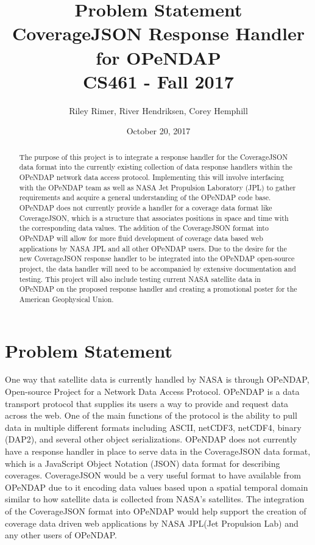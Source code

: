 \documentclass[letterpaper,10pt,draftclsnofoot,onecolumn]{IEEEtran}
\title{
Problem Statement\\ 
\large CoverageJSON Response Handler for OPeNDAP\\
\large CS461 -  Fall 2017\\
}
\author{Riley Rimer, River Hendriksen, Corey Hemphill}
\date{October 20, 2017}
\begin{document}
\begin{titlepage}

\maketitle
% 
% 
\centering

\begin{abstract}
The purpose of this project is to integrate a response handler for the CoverageJSON data format into the currently existing collection of data response handlers within the OPeNDAP network data access protocol. Implementing this will involve interfacing with the OPeNDAP team as well as NASA Jet Propulsion Laboratory (JPL) to gather requirements and acquire a general understanding of the OPeNDAP code base. OPeNDAP does not currently provide a handler for a coverage data format like CoverageJSON, which is a structure that associates positions in space and time with the corresponding data values. The addition of the CoverageJSON format into OPeNDAP will allow for more fluid development of coverage data based web applications by NASA JPL and all other OPeNDAP users. Due to the desire for the new CoverageJSON response handler to be integrated into the OPeNDAP open-source project, the data handler will need to be accompanied by extensive documentation and testing. This project will also include testing current NASA satellite data in OPeNDAP on the proposed response handler and creating a promotional poster for the American Geophysical Union.
\end{abstract}

\end{titlepage}

\section{Problem Statement}
One way that satellite data is currently handled by NASA is through OPeNDAP, Open-source Project for a Network Data Access Protocol. OPeNDAP is a data transport protocol that supplies its users a way to provide and request data across the web. One of the main functions of the protocol is the ability to pull data in multiple different formats including ASCII, netCDF3, netCDF4, binary (DAP2), and several other object serializations. OPeNDAP does not currently have a response handler in place to serve data in the CoverageJSON data format, which is a JavaScript Object Notation (JSON) data format for describing coverages. CoverageJSON would be a very useful format to have available from OPeNDAP due to it encoding data values based upon a spatial temporal domain similar to how satellite data is collected from NASA's satellites. The integration of the CoverageJSON format into OPeNDAP would help support the creation of coverage data driven web applications by NASA JPL(Jet Propulsion Lab) and any other users of OPeNDAP.
\end{document}
